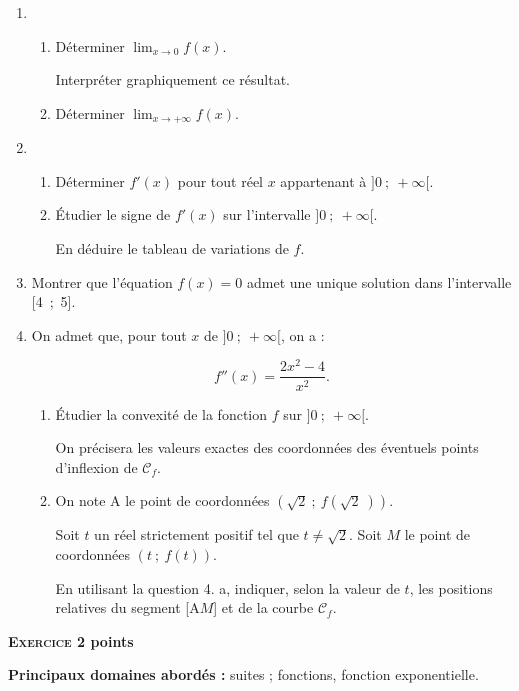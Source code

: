 \documentclass[11pt]{article}
\begin{document}
\begin{enumerate}
\item 
	\begin{enumerate}
		\item Déterminer $\displaystyle\lim_{x \to 0} f(x)$.
	
Interpréter graphiquement ce résultat.
		\item Déterminer $\displaystyle\lim_{x \to + \infty} f(x)$.
	\end{enumerate}	
\item
	\begin{enumerate}
		\item Déterminer $f'(x)$ pour tout réel $x$ appartenant à $]0~;~+ \infty[$.

		\item Étudier le signe de $f'(x)$ sur l'intervalle $]0~;~+ \infty[$.
		
En déduire le tableau de variations de $f$.
	\end{enumerate}
\item Montrer que l'équation $f(x) = 0$ admet une unique solution dans l'intervalle [4~;~5].
\item On admet que, pour tout $x$ de $]0~;~+ \infty[$, on a :

\[f''(x) = \dfrac{2x^2 - 4}{x^2}.\]

	\begin{enumerate}
		\item Étudier la convexité de la fonction $f$ sur $]0~;~+ \infty[$.
		
On précisera les valeurs exactes des coordonnées des éventuels points d'inflexion de $\mathcal{C}_f$.
		\item On note A le point de coordonnées $\left(\sqrt 2~;~f\left(\sqrt 2~\right)\right)$.
		
Soit $t$ un réel strictement positif tel que $t \ne \sqrt 2$. Soit $M$ le point de coordonnées $(t~;~ f(t))$.

En utilisant la question 4. a, indiquer, selon la valeur de $t$, les positions relatives du segment [A$M$] et de la courbe $\mathcal{C}_f$.
	\end{enumerate}
\end{enumerate}

\bigskip

\textbf{\textsc{Exercice 2}  points\hfill}

\medskip

\textbf{Principaux domaines abordés :}
suites ;
fonctions, fonction exponentielle.
\end{document}
